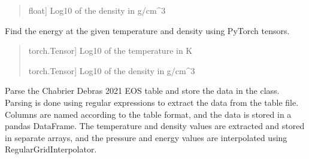 \documentclass[letterpaper,10pt,english]{sphinxmanual}
\begin{document}
\begin{fulllineitems}
\begin{fulllineitems}
\begin{quote}
\begin{description}
\begin{description}
\sphinxlineitem{\sphinxstylestrong{logRho}}{[}float{]}
\sphinxAtStartPar
Log10 of the density in g/cm\textasciicircum{}3

\end{description}

\end{description}\end{quote}

\end{fulllineitems}


\begin{fulllineitems}
\label{\detokenize{CoolDwarf.EOS.ChabrierDebras2021:CoolDwarf.EOS.ChabrierDebras2021.EOS.CH21EOS.energy_torch}}
\pysigstartsignatures
{}
\pysigstopsignatures
\sphinxAtStartPar
Find the energy at the given temperature and density using PyTorch tensors.
\begin{quote}\begin{description}
\begin{description}
\sphinxlineitem{\sphinxstylestrong{logT}}{[}torch.Tensor{]}
\sphinxAtStartPar
Log10 of the temperature in K

\sphinxlineitem{\sphinxstylestrong{logRho}}{[}torch.Tensor{]}
\sphinxAtStartPar
Log10 of the density in g/cm\textasciicircum{}3

\end{description}

\end{description}\end{quote}

\end{fulllineitems}


\begin{fulllineitems}
\label{\detokenize{CoolDwarf.EOS.ChabrierDebras2021:CoolDwarf.EOS.ChabrierDebras2021.EOS.CH21EOS.parse_table}}
\pysigstartsignatures
{}
\pysigstopsignatures
\sphinxAtStartPar
Parse the Chabrier Debras 2021 EOS table and store the data in the class. Parsing is done using regular
expressions to extract the data from the table file. Columns are named according to the table format, and the
data is stored in a pandas DataFrame. The temperature and density values are extracted and stored in separate
arrays, and the pressure and energy values are interpolated using RegularGridInterpolator.


\end{fulllineitems}
\end{fulllineitems}
\end{document}

